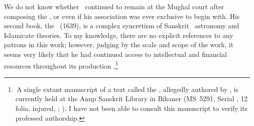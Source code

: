 We do not know whether \Nityananda\ continued to remain at the Mughal court after composing the \Siddhantasindhu, or even if his association was ever exclusive to begin with. His second book, the \Sarvasiddhantaraja\ (1639), is a complex syncretism of Sanskrit \siddhantic\ astronomy and Islamicate theories. To my knowledge, there are no explicit references to any patrons in this work; however, judging by the scale and scope of the work, it seems very likely that he had continued access to intellectual and financial resources throughout its production \parencite[more on this in][]{MisraTD}.\footnote{\,A single extant manuscript of a text called the \Shahajahamganita, allegedly authored by \Nityananda, is currently held at the Anup Sanskrit Library in Bikaner (MS~5291, Serial , 12 folia, injured, \vid \cite[p.\thinspace 174a in Volume A3]{PingreeCESS}; \cite[393]{AnupSanskritLibrary}). I have not been able to consult this manuscript to verify its professed authorship.} 

 






